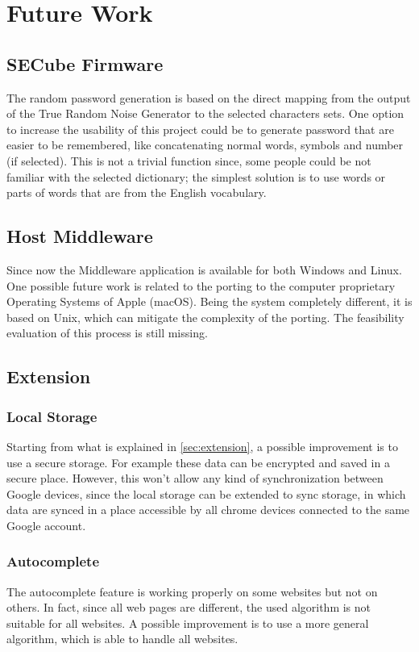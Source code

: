 \section{Future Work}
\label{sec:future_work}


\subsection{SECube Firmware}
The random password generation is based on the direct mapping from the output of the True Random Noise Generator to the selected characters sets. One option to increase the usability of this project could be to generate password that are easier to be remembered, like concatenating normal words, symbols and number (if selected). This is not a trivial function since, some people could be not familiar with the selected dictionary; the simplest solution is to use words or parts of words that are from the English vocabulary.


\subsection{Host Middleware}
Since now the Middleware application is available for both Windows and Linux. One possible future work is related to the porting to the computer proprietary Operating Systems of Apple (macOS). Being the system completely different, it is based on Unix, which can mitigate the complexity of the porting. The feasibility evaluation of this process is still missing.

\subsection{Extension}
\subsubsection{Local Storage}
Starting from what is explained in \autoref{sec:extension}, a possible improvement is to use a secure storage. For example these data can be encrypted and saved in a secure place. However, this won't allow any kind of synchronization between Google devices, since the local storage can be extended to sync storage, in which data are synced in a place accessible by all chrome devices connected to the same Google account.

\subsubsection{Autocomplete}
The autocomplete feature is working properly on some websites but not on others. In fact, since all web pages are different, the used algorithm is not suitable for all websites. A possible improvement is to use a more general algorithm, which is able to handle all websites.

